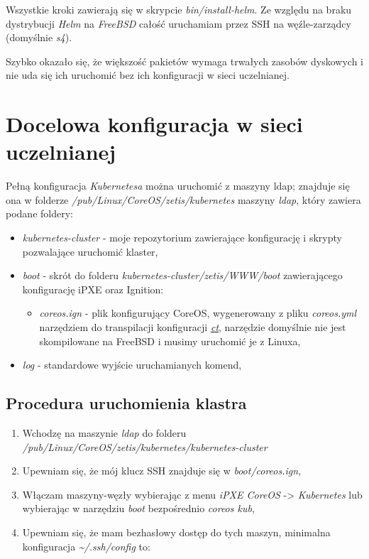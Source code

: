\documentclass[a4paper,12pt,twoside,openany]{report}
\providecommand{\tightlist}{%
  \setlength{\itemsep}{0pt}\setlength{\parskip}{0pt}}
\begin{document}
Wszystkie kroki zawierają się w skrypcie \emph{bin/install-helm}. Ze
względu na braku dystrybucji \emph{Helm} na \emph{FreeBSD} całość
uruchamiam przez SSH na węźle-zarządcy (domyślnie \emph{s4}).

Szybko okazało się, że większość pakietów wymaga trwałych zasobów
dyskowych i nie uda się ich uruchomić bez ich konfiguracji w sieci
uczelnianej.

\hypertarget{docelowa-konfiguracja-w-sieci-uczelnianej}{%
\chapter{Docelowa konfiguracja w sieci
uczelnianej}\label{docelowa-konfiguracja-w-sieci-uczelnianej}}

Pełną konfiguracja \emph{Kubernetesa} można uruchomić z maszyny ldap;
znajduje się ona w folderze \emph{/pub/Linux/CoreOS/zetis/kubernetes}
maszyny \emph{ldap}, który zawiera podane foldery:

\begin{itemize}
\tightlist
\item
  \emph{kubernetes-cluster} - moje repozytorium zawierające konfigurację
  i skrypty pozwalające uruchomić klaster,
\item
  \emph{boot} - skrót do folderu
  \emph{kubernetes-cluster/zetis/WWW/boot} zawierającego konfigurację
  iPXE oraz Ignition:

  \begin{itemize}
  \tightlist
  \item
    \emph{coreos.ign} - plik konfigurujący CoreOS, wygenerowany z pliku
    \emph{coreos.yml} narzędziem do transpilacji konfiguracji
    \href{https://github.com/coreos/container-linux-config-transpiler}{\emph{ct}},
    narzędzie domyślnie nie jest skompilowane na FreeBSD i musimy
    uruchomić je z Linuxa,
  \end{itemize}
\item
  \emph{log} - standardowe wyjście uruchamianych komend,
\end{itemize}

\hypertarget{procedura-uruchomienia-klastra}{%
\section{Procedura uruchomienia
klastra}\label{procedura-uruchomienia-klastra}}

\begin{enumerate}
\def\labelenumi{\arabic{enumi}.}
\tightlist
\item
  Wchodzę na maszynie \emph{ldap} do folderu
  \emph{/pub/Linux/CoreOS/zetis/kubernetes/kubernetes-cluster}
\item
  Upewniam się, że mój klucz SSH znajduje się w \emph{boot/coreos.ign},
\item
  Włączam maszyny-węzły wybierając z menu \emph{iPXE CoreOS}
  -\textgreater{} \emph{Kubernetes} lub wybierając w narzędziu
  \emph{boot} bezpośrednio \emph{coreos kub},
\item
  Upewniam się, że mam bezhasłowy dostęp do tych maszyn, minimalna
  konfiguracja \emph{\textasciitilde{}/.ssh/config} to:
\end{enumerate}
\end{document}
